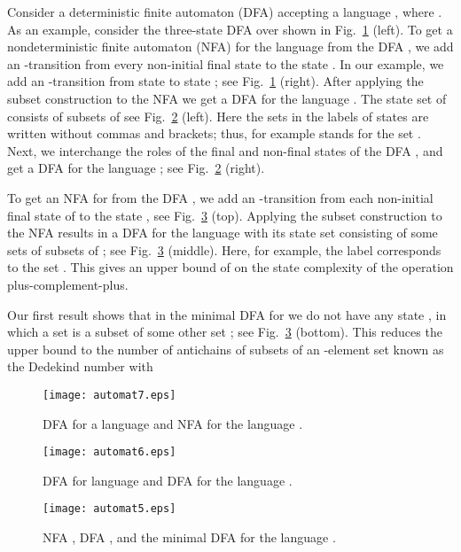 \documentclass[runningheads]{llncs}
\begin{document}
Consider a deterministic finite automaton
(DFA) 
accepting a language , where .
As an example, consider the three-state DFA over 
shown in Fig.~\ref{fig:d_n1} (left).
To get a nondeterministic finite automaton
(NFA)  for the language  from the DFA ,
we add an -transition 
from every non-initial final state to the state .
In our example, we add an -transition from state  to state ;
see Fig.~\ref{fig:d_n1} (right).
After applying the subset construction to the NFA 
we get a DFA  for the language .
The state set of  consists 
of subsets of 
see Fig.~\ref{fig:d1d2} (left). Here the sets in the labels of states
are written without commas and brackets;
thus, for example  stands for the set .
Next, we interchange the roles of the
final and non-final states of the DFA ,
and get a DFA  for the language ; see Fig.~\ref{fig:d1d2} (right).



To get an NFA  for  from the DFA ,
we add an -transition from each non-initial final state of 
to the state , see Fig.~\ref{fig:n2d3d3min} (top).
Applying the subset construction to the NFA 
results in a DFA  for the language 
with its state set
consisting of some sets of subsets of ;
see Fig.~\ref{fig:n2d3d3min} (middle). Here, for example, the label 
corresponds to the set .
This gives an  upper bound of 
on the state complexity of the operation plus-complement-plus.

Our first result shows that 
in the minimal DFA for 
we do not have
any state ,
in which a set  is a subset of some other set ;
see Fig.~\ref{fig:n2d3d3min} (bottom).
This reduces the upper bound 
to the  number of antichains of subsets
of an -element set known as the Dedekind number  with
\cite{KM75}


\vskip-10pt
\begin{figure}\label{-----fig1}
\centering
\texttt{[image: automat7.eps]}
\caption{DFA  for a language  and NFA  for the language .}
\label{fig:d_n1}
\end{figure}

\vskip-20pt
\begin{figure}[h!]\label{-----fig2}
\centering
\texttt{[image: automat6.eps]}
\caption{DFA  for  language  and DFA  for the language .}
\label{fig:d1d2}
\end{figure}


\begin{figure}[h!]\label{-----fig3}
\centering
\texttt{[image: automat5.eps]}
\caption{NFA , DFA , and the minimal DFA 
          for the language .}
\label{fig:n2d3d3min}
\end{figure}
\end{document}
